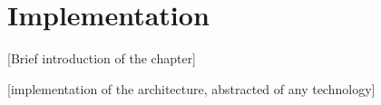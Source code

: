 \chapter{Implementation}
 [Brief introduction of the chapter]

 [implementation of the architecture, abstracted of any technology]



